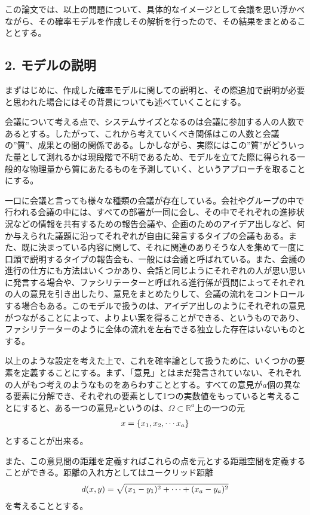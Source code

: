 \documentclass[letterpaper,10pt,english]{sphinxmanual}
\begin{document}
この論文では、以上の問題について、具体的なイメージとして会議を思い浮かべながら、その確率モデルを作成しその解析を行ったので、その結果をまとめることとする。


\subsection{2. モデルの説明}
\label{draft:id4}
まずはじめに、作成した確率モデルに関しての説明と、その際追加で説明が必要と思われた場合にはその背景についても述べていくことにする。

会議について考える点で、システムサイズとなるのは会議に参加する人の人数であるとする。したがって、これから考えていくべき関係はこの人数と会議の''質''、成果との間の関係である。しかしながら、実際にはこの''質''がどういった量として測れるかは現段階で不明であるため、モデルを立てた際に得られる一般的な物理量から質にあたるものを予測していく、というアプローチを取ることにする。

一口に会議と言っても様々な種類の会議が存在している。会社やグループの中で行われる会議の中には、すべての部署が一同に会し、その中でそれぞれの進捗状況などの情報を共有するための報告会議や、企画のためのアイデア出しなど、何か与えられた議題に沿ってそれぞれが自由に発言するタイプの会議もある。また、既に決まっている内容に関して、それに関連のありそうな人を集めて一度に口頭で説明するタイプの報告会も、一般には会議と呼ばれている。また、会議の進行の仕方にも方法はいくつかあり、会話と同じようにそれぞれの人が思い思いに発言する場合や、ファシリテーターと呼ばれる進行係が質問によってそれぞれの人の意見を引き出したり、意見をまとめたりして、会議の流れをコントロールする場合もある。このモデルで扱うのは、アイデア出しのようにそれぞれの意見がつながることによって、よりよい案を得ることができる、というものであり、ファシリテーターのように全体の流れを左右できる独立した存在はいないものとする。

以上のような設定を考えた上で、これを確率論として扱うために、いくつかの要素を定義することにする。まず、「意見」とはまだ発言されていない、それぞれの人がもつ考えのようなものをあらわすこととする。すべての意見が\(a\)個の異なる要素に分解でき、それぞれの要素として1つの実数値をもっていると考えることにすると、ある一つの意見\(x\)というのは、\(\Omega \subset \mathbb{R}^{a}\)上の一つの元
\begin{gather}
\begin{split}x = \{x_{1}, x_{2}, \cdots x_{a}\}\end{split}\notag
\end{gather}
とすることが出来る。

また、この意見間の距離を定義すればこれらの点を元とする距離空間を定義することができる。距離の入れ方としてはユークリッド距離
\begin{gather}
\begin{split}d(x, y) = \sqrt{(x_{1} - y_{1})^{2} + \cdots + (x_{a} - y_{a})^{2}}\end{split}\notag
\end{gather}
を考えることとする。
\end{document}
